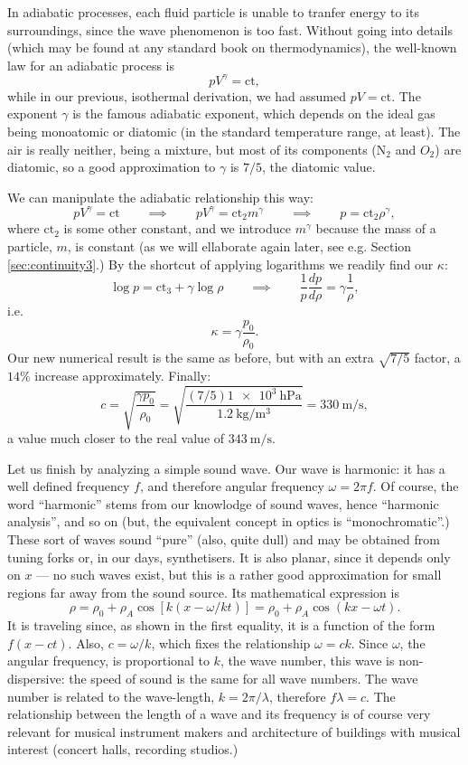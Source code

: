 In adiabatic processes, each fluid particle is unable to tranfer
energy to its surroundings, since the wave phenomenon is too
fast. Without going into details (which may be found at any standard
book on thermodynamics), the well-known law for an adiabatic process is
\[
p V^\gamma = \mathrm{ct} ,
\]
while in our previous, isothermal derivation, we had assumed $ p V =
\mathrm{ct} $. The exponent $\gamma$ is the famous adiabatic exponent,
which depends on the ideal gas being monoatomic or diatomic (in the
standard temperature range, at least). The air is really neither,
being a mixture, but most of its components (N$_2$ and $O_2$) are
diatomic, so a good approximation to $\gamma$ is $7/5$, the diatomic
value.

We can manipulate the adiabatic relationship this way:
\[
p V^\gamma = \mathrm{ct} \qquad\implies\qquad
p V^\gamma = \mathrm{ct}_2 m^\gamma \qquad\implies\qquad
p = \mathrm{ct}_2 \rho^\gamma ,
\]
where $\mathrm{ct}_2$ is some other constant, and we introduce
$m^\gamma$ because the mass of a particle, $m$, is constant (as we
will ellaborate again later, see e.g. Section \ref{sec:continuity3}.)
By the shortcut of applying logarithms we readily find our $\kappa$:
\[
\log p = \mathrm{ct}_3 + \gamma \log \rho  \qquad\implies\qquad
\frac{1}{ p }
\frac{d p}{d\rho}=  \gamma \frac{1}{\rho} ,
\]
i.e.
\[
\kappa = \gamma \frac{p_0}{\rho_0} .
\]
Our new numerical result is the same as before, but with
an extra $\sqrt{7/5}$ factor, a $14\%$ increase approximately.
Finally:
\[
c= \sqrt{\frac{\gamma p_0 }{ \rho_0 }} =
\sqrt{\frac%
  { (7/5)  \SI{1e3}{\hecto\pascal} }%
  {\SI{1.2}{\kilo\gram\per\meter\cubed}}} =
\SI{330}{\meter\per\second} ,
\]
a value much closer to the real value of $\SI{343}{\meter\per\second} $.

Let us finish by analyzing a simple sound wave. Our wave is harmonic:
it has a well defined frequency $f$, and therefore angular frequency
$\omega=2\pi f$. Of course, the word ``harmonic'' stems from our
knowlodge of sound waves, hence ``harmonic analysis'', and so on (but,
the equivalent concept in optics is ``monochromatic''.) These sort of
waves sound ``pure'' (also, quite dull) and may be obtained from
tuning forks or, in our days, synthetisers. It is also planar, since
it depends only on $x$ --- no such waves exist, but this is a rather
good approximation for small regions far away from the sound source.
Its mathematical expression is
\[
\rho = \rho_0 +  \rho_A \cos[ k ( x  - \omega/k  t) ]
= \rho_0 + \rho_A \cos(k x  - \omega t) .
\]
It is traveling since, as shown in the first equality, it is a
function of the form $f(x-ct)$. Also, $c= \omega/k$, which fixes the
relationship $\omega = c k$. Since $\omega$, the angular frequency, is
proportional to $k$, the wave number, this wave is non-dispersive: the
speed of sound is the same for all wave numbers. The wave number is
related to the wave-length, $k=2\pi/\lambda$, therefore $f \lambda =
c$. The relationship between the length of a wave and its frequency is
of course very relevant for musical instrument makers and architecture
of buildings with musical interest (concert halls, recording studios.)

